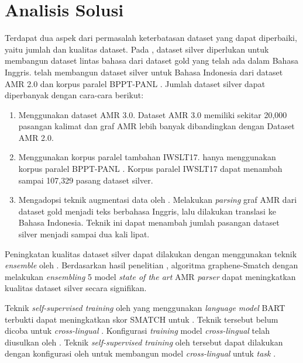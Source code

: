 \section{Analisis Solusi}

Terdapat dua aspek dari permasalah keterbatasan dataset yang dapat diperbaiki, yaitu jumlah dan kualitas dataset.
Pada \amrparsing{}, dataset silver diperlukan untuk membangun dataset lintas bahasa dari dataset gold yang telah ada dalam Bahasa Inggris.
\textcite{putra2022} telah membangun dataset silver untuk Bahasa Indonesia dari dataset AMR 2.0 dan korpus paralel BPPT-PANL .
Jumlah dataset silver dapat diperbanyak dengan cara-cara berikut:
\begin{enumerate}
  \item Menggunakan dataset AMR 3.0.
  Dataset AMR 3.0 memiliki sekitar 20,000 pasangan kalimat dan graf \gls{AMR} lebih banyak dibandingkan dengan Dataset AMR 2.0.

  \item Menggunakan korpus paralel tambahan IWSLT17.
  \textcite{putra2022} hanya menggunakan korpus paralel BPPT-PANL .
  Korpus paralel IWSLT17  dapat menambah sampai 107,329 pasang dataset silver.

  \item Mengadopsi teknik augmentasi data oleh \textcite{lee2022}.
  Melakukan \textit{parsing} graf \gls{AMR} dari dataset gold menjadi teks berbahasa Inggris, lalu dilakukan translasi ke Bahasa Indonesia.
  Teknik ini dapat menambah jumlah pasangan dataset silver menjadi sampai dua kali lipat.
\end{enumerate}

Peningkatan kualitas dataset silver dapat dilakukan dengan menggunakan teknik \textit{ensemble} oleh \textcite{lee2022}.
Berdasarkan hasil penelitian \textcite{lee2022}, algoritma graphene-Smatch  dengan melakukan \textit{ensembling} 5 model \textit{state of the art} \gls{AMR} \textit{parser} dapat meningkatkan kualitas dataset silver secara signifikan.

Teknik \textit{self-supervised training} oleh \textcite{bai2022} yang menggunakan \textit{language model} \gls{BART} terbukti dapat meningkatkan skor \gls{SMATCH} untuk \amrparsing{}.
Teknik tersebut belum dicoba untuk \textit{cross-lingual} \amrparsing{}.
Konfigurasi \textit{training} model \textit{cross-lingual} \amrparsing{} telah diusulkan oleh \textcite{blloshmi2020}.
Teknik \textit{self-supervised training} oleh \textcite{bai2022} tersebut dapat dilakukan dengan konfigurasi oleh \textcite{blloshmi2020} untuk membangun model \textit{cross-lingual} untuk \textit{task} \amrparsing{}.

